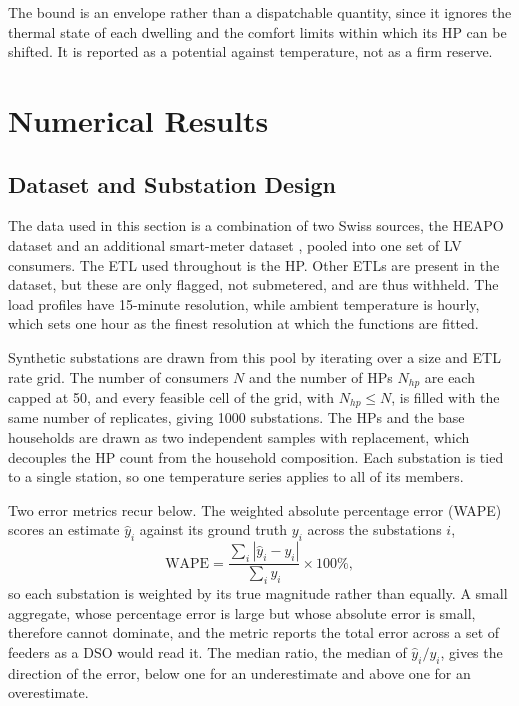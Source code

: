 \documentclass[9pt,journal,a4]{IEEEtran}
\begin{document}
The bound is an envelope rather than a dispatchable quantity, since it ignores the thermal state of each dwelling and the comfort limits within which its HP can be shifted. It is reported as a potential against temperature, not as a firm reserve.


\section{Numerical Results}
\label{sec:results}


\subsection{Dataset and Substation Design}
\label{sec:data}

The data used in this section is a combination of two Swiss sources, the HEAPO dataset \cite{Bru25} and an additional smart-meter dataset \cite{Kai26b}, pooled into one set of LV consumers. The ETL used throughout is the HP. Other ETLs are present in the dataset, but these are only flagged, not submetered, and are thus withheld. The load profiles have 15-minute resolution, while ambient temperature is hourly, which sets one hour as the finest resolution at which the functions are fitted.

Synthetic substations are drawn from this pool by iterating over a size and ETL rate grid. The number of consumers $N$ and the number of HPs $N_{hp}$ are each capped at 50, and every feasible cell of the grid, with $N_{hp} \leq N$, is filled with the same number of replicates, giving 1000 substations. The HPs and the base households are drawn as two independent samples with replacement, which decouples the HP count from the household composition. Each substation is tied to a single station, so one temperature series applies to all of its members.

Two error metrics recur below. The weighted absolute percentage error (WAPE) scores an estimate $\hat{y}_i$ against its ground truth $y_i$ across the substations $i$,
\begin{equation}
\mathrm{WAPE} = \frac{\sum_i |\hat{y}_i - y_i|}{\sum_i y_i} \times 100\%,
\label{eq:wape}
\end{equation}
so each substation is weighted by its true magnitude rather than equally. A small aggregate, whose percentage error is large but whose absolute error is small, therefore cannot dominate, and the metric reports the total error across a set of feeders as a DSO would read it. The median ratio, the median of $\hat{y}_i / y_i$, gives the direction of the error, below one for an underestimate and above one for an overestimate.
\end{document}
